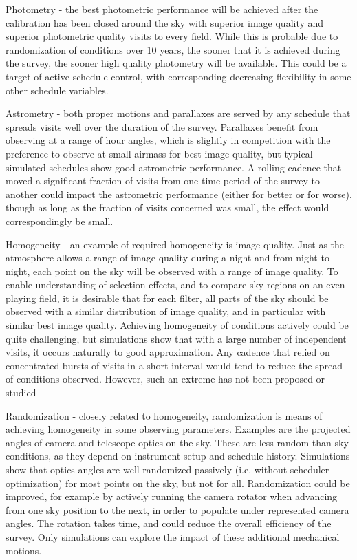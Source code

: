 Photometry - the best photometric performance will be achieved after the
calibration has been closed around the sky with superior image quality
and superior photometric quality visits to every field.  While this is
probable due to randomization of conditions over 10 years, the sooner
that it is achieved during the survey, the sooner high quality
photometry will be available.  This could be a target of active schedule
control, with corresponding decreasing flexibility in some other
schedule variables.

Astrometry - both proper motions and parallaxes are served by any
schedule that spreads visits well over the duration of the survey.
Parallaxes benefit from observing at a range of hour angles, which is
slightly in competition with the preference to observe at small airmass
for best image quality, but typical simulated schedules show good
astrometric performance. A rolling cadence that moved a significant
fraction of visits from one time period of the survey to another could
impact the astrometric performance (either for better or for worse),
though as long as the fraction of visits concerned was small, the effect
would correspondingly be small.

Homogeneity - an  example of required homogeneity is image quality.
Just as the atmosphere allows a range of image quality during a night
and from night to night, each point on the sky will be observed with a
range of image quality.  To enable understanding of selection effects,
and to compare sky regions on an even playing field, it is desirable
that for each filter, all parts of the sky should be observed with a
similar distribution of image quality, and in particular with similar
best image quality. Achieving homogeneity of conditions actively could
be quite challenging, but simulations show that with a large number of
independent visits, it occurs naturally to good approximation.  Any
cadence that relied on concentrated bursts of visits in a short interval
would tend to reduce the spread of conditions observed. However, such an
extreme has not been proposed or studied

Randomization - closely related to homogeneity, randomization is means
of achieving homogeneity in some observing parameters.  Examples are the
projected angles of camera and telescope optics on the sky. These are
less random than sky conditions, as they depend on instrument setup and
schedule history.  Simulations show that optics angles are well
randomized passively (i.e. without scheduler optimization) for most
points on the sky, but not for all.  Randomization could be improved,
for example by actively running the camera rotator when advancing from
one sky position to the next, in order to populate under represented
camera angles. The rotation takes time, and could reduce the overall
efficiency of the survey.  Only simulations can explore the impact of
these additional mechanical motions.

